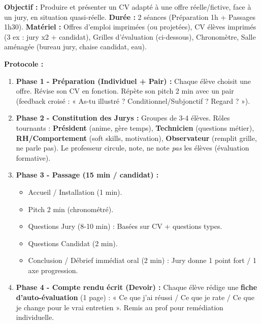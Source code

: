 \documentclass[11pt]{article}
\begin{document}
\begin{experience}
\textbf{Objectif :} Produire et présenter un CV adapté à une offre réelle/fictive, face à un jury, en situation quasi-réelle.
\textbf{Durée :} 2 séances (Préparation 1h + Passages 1h30).
\textbf{Matériel :} Offres d'emploi imprimées (ou projetées), CV élèves imprimés (3 ex : jury x2 + candidat), Grilles d'évaluation (ci-dessous), Chronomètre, Salle aménagée (bureau jury, chaise candidat, eau).

\textbf{Protocole :}
\begin{enumerate}
    \item \textbf{Phase 1 - Préparation (Individuel + Pair) :} Chaque élève choisit une offre. Révise son CV en fonction. Répète son pitch 2 min avec un pair (feedback croisé : « As-tu illustré ? Conditionnel/Subjonctif ? Regard ? »).
    \item \textbf{Phase 2 - Constitution des Jurys :} Groupes de 3-4 élèves. Rôles tournants : \textbf{Président} (anime, gère temps), \textbf{Technicien} (questions métier), \textbf{RH/Comportement} (soft skills, motivation), \textbf{Observateur} (remplit grille, ne parle pas). Le professeur circule, note, ne note \emph{pas} les élèves (évaluation formative).
    \item \textbf{Phase 3 - Passage (15 min / candidat) :}
        \begin{itemize}
            \item Accueil / Installation (1 min).
            \item Pitch 2 min (chronométré).
            \item Questions Jury (8-10 min) : Basées sur CV + questions types.
            \item Questions Candidat (2 min).
            \item Conclusion / Débrief immédiat oral (2 min) : Jury donne 1 point fort / 1 axe progression.
        \end{itemize}
    \item \textbf{Phase 4 - Compte rendu écrit (Devoir) :} Chaque élève rédige une \textbf{fiche d'auto-évaluation} (1 page) : « Ce que j'ai réussi / Ce que je rate / Ce que je change pour le vrai entretien ». Remis au prof pour remédiation individuelle.
\end{enumerate}
\end{experience}
\end{document}
